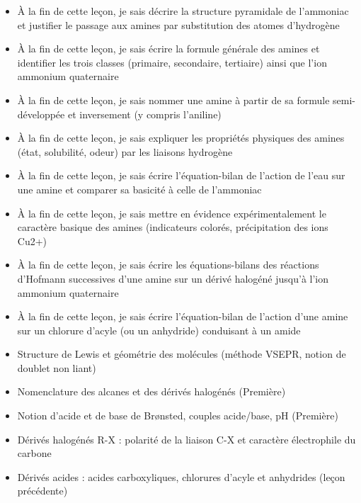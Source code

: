 \documentclass[11pt]{article}
\begin{document}
\begin{objectifs}
\begin{itemize}
\item À la fin de cette leçon, je sais décrire la structure pyramidale de l'ammoniac et justifier le passage aux amines par substitution des atomes d'hydrogène
\item À la fin de cette leçon, je sais écrire la formule générale des amines et identifier les trois classes (primaire, secondaire, tertiaire) ainsi que l'ion ammonium quaternaire
\item À la fin de cette leçon, je sais nommer une amine à partir de sa formule semi-développée et inversement (y compris l'aniline)
\item À la fin de cette leçon, je sais expliquer les propriétés physiques des amines (état, solubilité, odeur) par les liaisons hydrogène
\item À la fin de cette leçon, je sais écrire l'équation-bilan de l'action de l'eau sur une amine et comparer sa basicité à celle de l'ammoniac
\item À la fin de cette leçon, je sais mettre en évidence expérimentalement le caractère basique des amines (indicateurs colorés, précipitation des ions Cu2+)
\item À la fin de cette leçon, je sais écrire les équations-bilans des réactions d'Hofmann successives d'une amine sur un dérivé halogéné jusqu'à l'ion ammonium quaternaire
\item À la fin de cette leçon, je sais écrire l'équation-bilan de l'action d'une amine sur un chlorure d'acyle (ou un anhydride) conduisant à un amide
\end{itemize}
\end{objectifs}

\begin{prerequis}
\begin{itemize}
\item Structure de Lewis et géométrie des molécules (méthode VSEPR, notion de doublet non liant)
\item Nomenclature des alcanes et des dérivés halogénés (Première)
\item Notion d'acide et de base de Brønsted, couples acide/base, pH (Première)
\item Dérivés halogénés R-X : polarité de la liaison C-X et caractère électrophile du carbone
\item Dérivés acides : acides carboxyliques, chlorures d'acyle et anhydrides (leçon précédente)
\end{itemize}
\end{prerequis}
\end{document}
